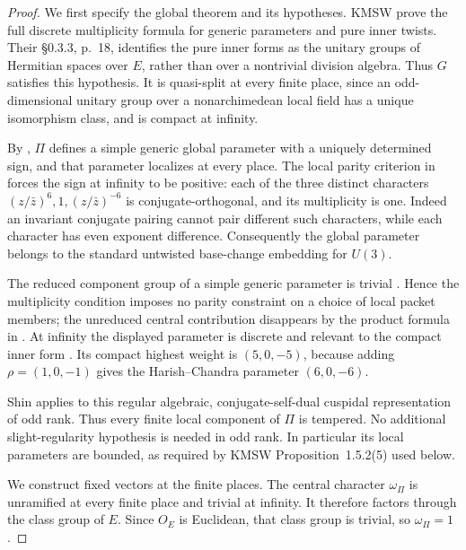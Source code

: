 \documentclass[11pt,a4paper]{article}
\theoremstyle{definition}
\begin{document}
\begin{proof}
We first specify the global theorem and its hypotheses. KMSW
\cite[Theorem~5.0.5 and its preceding paragraph, p.~206]{K17KMSW2014}
prove the full discrete multiplicity formula for generic parameters and
pure inner twists. Their \S0.3.3, p.~18, identifies the pure inner forms
as the unitary groups of Hermitian spaces over $E$, rather than over a
nontrivial division algebra. Thus $G$ satisfies this hypothesis. It is
quasi-split at every finite place, since an odd-dimensional unitary group
over a nonarchimedean local field has a unique isomorphism class, and is
compact at infinity.

By \cite[Propositions~1.3.1 and~1.3.3, pp.~67, 70--71]{K17KMSW2014},
$\Pi$ defines a simple generic global parameter with a uniquely determined
sign, and that parameter localizes at every place. The local parity
criterion in \cite[\S1.2.3 and Lemma~1.2.5, pp.~59--61]{K17KMSW2014}
forces the sign at infinity to be positive: each of the three distinct
characters $(z/\bar z)^6,1,(z/\bar z)^{-6}$ is conjugate-orthogonal,
and its multiplicity is one. Indeed an invariant conjugate pairing cannot
pair different such characters, while each character has even exponent
difference. Consequently the global parameter belongs to the standard
untwisted base-change embedding for $U(3)$.

The reduced component group of a simple generic parameter is trivial
\cite[\S1.3.4--1.3.5, pp.~69--70]{K17KMSW2014}. Hence the multiplicity
condition imposes no parity constraint on a choice of local packet members;
the unreduced central contribution disappears by the product formula in
\cite[\S1.7, pp.~88--89]{K17KMSW2014}. At infinity the displayed parameter
is discrete and relevant to the compact inner form
\cite[Remark~A.11.8, p.~236]{K17BCFamilies2009}. Its compact highest weight
is $(5,0,-5)$, because adding $\rho=(1,0,-1)$ gives the Harish--Chandra
parameter $(6,0,-6)$.

Shin \cite[Theorem~1.2 and Corollary~1.3, pp.~1647--1648;
Corollary~7.9 and its printed proof, p.~1728]{K17Shin2011}
applies to this regular algebraic, conjugate-self-dual cuspidal
representation of odd rank. Thus every finite local component of $\Pi$
is tempered. No additional slight-regularity hypothesis is needed in odd
rank. In particular its local parameters are bounded, as required by
KMSW Proposition~1.5.2(5) used below.

We construct fixed vectors at the finite places. The central character
$\omega_\Pi$ is unramified at every finite place and trivial at infinity.
It therefore factors through the class group of $E$. Since $O_E$ is
Euclidean, that class group is trivial, so $\omega_\Pi=1$.


\end{proof}
\end{document}
